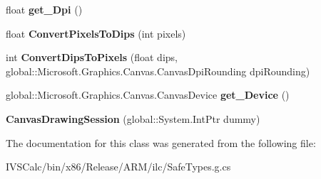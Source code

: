 \begin{DoxyCompactItemize}
\item 
\mbox{\label{class_microsoft_1_1_graphics_1_1_canvas_1_1_canvas_drawing_session_aa494d5f2ded4d6e3d804b293b5f8cec3}} 
float {\bfseries get\+\_\+\+Dpi} ()
\item 
\mbox{\label{class_microsoft_1_1_graphics_1_1_canvas_1_1_canvas_drawing_session_a3d874cf93ca10e468bf997537c2d5e78}} 
float {\bfseries Convert\+Pixels\+To\+Dips} (int pixels)
\item 
\mbox{\label{class_microsoft_1_1_graphics_1_1_canvas_1_1_canvas_drawing_session_ae35be92d0924e7e196ebfad854028d39}} 
int {\bfseries Convert\+Dips\+To\+Pixels} (float dips, global\+::\+Microsoft.\+Graphics.\+Canvas.\+Canvas\+Dpi\+Rounding dpi\+Rounding)
\item 
\mbox{\label{class_microsoft_1_1_graphics_1_1_canvas_1_1_canvas_drawing_session_a057ff80ae9eefd6516a3b0ed65388494}} 
global\+::\+Microsoft.\+Graphics.\+Canvas.\+Canvas\+Device {\bfseries get\+\_\+\+Device} ()
\item 
\mbox{\label{class_microsoft_1_1_graphics_1_1_canvas_1_1_canvas_drawing_session_ab5926d0958db9bb95f10d9c1149f007b}} 
{\bfseries Canvas\+Drawing\+Session} (global\+::\+System.\+Int\+Ptr dummy)
\end{DoxyCompactItemize}


The documentation for this class was generated from the following file\+:\begin{DoxyCompactItemize}
\item 
I\+V\+S\+Calc/bin/x86/\+Release/\+A\+R\+M/ilc/Safe\+Types.\+g.\+cs\end{DoxyCompactItemize}
